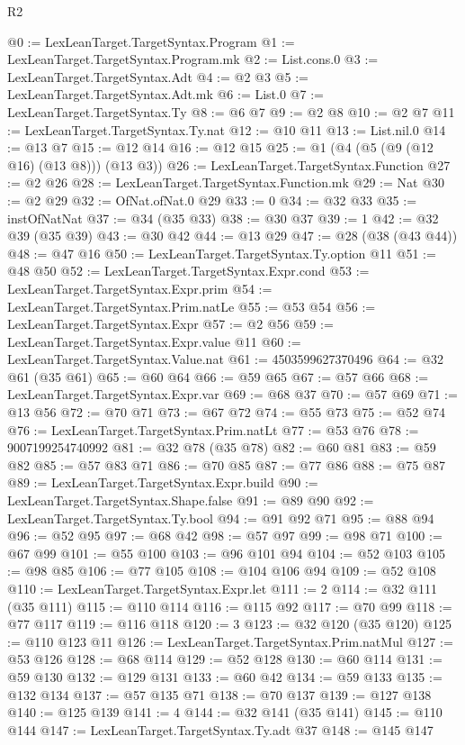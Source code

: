 \begin{lexlean}{R2}
\begin{coremodule}
@0 := LexLeanTarget.TargetSyntax.Program
@1 := LexLeanTarget.TargetSyntax.Program.mk
@2 := List.cons.{0}
@3 := LexLeanTarget.TargetSyntax.Adt
@4 := @2 @3
@5 := LexLeanTarget.TargetSyntax.Adt.mk
@6 := List.{0}
@7 := LexLeanTarget.TargetSyntax.Ty
@8 := @6 @7
@9 := @2 @8
@10 := @2 @7
@11 := LexLeanTarget.TargetSyntax.Ty.nat
@12 := @10 @11
@13 := List.nil.{0}
@14 := @13 @7
@15 := @12 @14
@16 := @12 @15
@25 := @1 (@4 (@5 (@9 (@12 @16) (@13 @8))) (@13 @3))
@26 := LexLeanTarget.TargetSyntax.Function
@27 := @2 @26
@28 := LexLeanTarget.TargetSyntax.Function.mk
@29 := Nat
@30 := @2 @29
@32 := OfNat.ofNat.{0} @29
@33 := 0
@34 := @32 @33
@35 := instOfNatNat
@37 := @34 (@35 @33)
@38 := @30 @37
@39 := 1
@42 := @32 @39 (@35 @39)
@43 := @30 @42
@44 := @13 @29
@47 := @28 (@38 (@43 @44))
@48 := @47 @16
@50 := LexLeanTarget.TargetSyntax.Ty.option @11
@51 := @48 @50
@52 := LexLeanTarget.TargetSyntax.Expr.cond
@53 := LexLeanTarget.TargetSyntax.Expr.prim
@54 := LexLeanTarget.TargetSyntax.Prim.natLe
@55 := @53 @54
@56 := LexLeanTarget.TargetSyntax.Expr
@57 := @2 @56
@59 := LexLeanTarget.TargetSyntax.Expr.value @11
@60 := LexLeanTarget.TargetSyntax.Value.nat
@61 := 4503599627370496
@64 := @32 @61 (@35 @61)
@65 := @60 @64
@66 := @59 @65
@67 := @57 @66
@68 := LexLeanTarget.TargetSyntax.Expr.var
@69 := @68 @37
@70 := @57 @69
@71 := @13 @56
@72 := @70 @71
@73 := @67 @72
@74 := @55 @73
@75 := @52 @74
@76 := LexLeanTarget.TargetSyntax.Prim.natLt
@77 := @53 @76
@78 := 9007199254740992
@81 := @32 @78 (@35 @78)
@82 := @60 @81
@83 := @59 @82
@85 := @57 @83 @71
@86 := @70 @85
@87 := @77 @86
@88 := @75 @87
@89 := LexLeanTarget.TargetSyntax.Expr.build
@90 := LexLeanTarget.TargetSyntax.Shape.false
@91 := @89 @90
@92 := LexLeanTarget.TargetSyntax.Ty.bool
@94 := @91 @92 @71
@95 := @88 @94
@96 := @52 @95
@97 := @68 @42
@98 := @57 @97
@99 := @98 @71
@100 := @67 @99
@101 := @55 @100
@103 := @96 @101 @94
@104 := @52 @103
@105 := @98 @85
@106 := @77 @105
@108 := @104 @106 @94
@109 := @52 @108
@110 := LexLeanTarget.TargetSyntax.Expr.let
@111 := 2
@114 := @32 @111 (@35 @111)
@115 := @110 @114
@116 := @115 @92
@117 := @70 @99
@118 := @77 @117
@119 := @116 @118
@120 := 3
@123 := @32 @120 (@35 @120)
@125 := @110 @123 @11
@126 := LexLeanTarget.TargetSyntax.Prim.natMul
@127 := @53 @126
@128 := @68 @114
@129 := @52 @128
@130 := @60 @114
@131 := @59 @130
@132 := @129 @131
@133 := @60 @42
@134 := @59 @133
@135 := @132 @134
@137 := @57 @135 @71
@138 := @70 @137
@139 := @127 @138
@140 := @125 @139
@141 := 4
@144 := @32 @141 (@35 @141)
@145 := @110 @144
@147 := LexLeanTarget.TargetSyntax.Ty.adt @37
@148 := @145 @147

\end{coremodule}
\end{lexlean}
